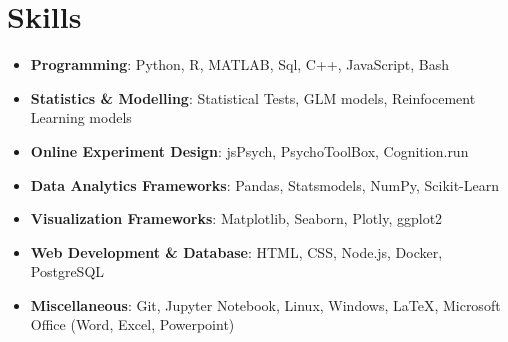 \documentclass[a4paper,10pt]{article}
\newcommand{\resumeItem}[2]{
  \item{
    \textbf{#1}{: #2}
  }
}
\newcommand{\resumeSubHeadingListStart}{\begin{itemize}[leftmargin=*]}
\newcommand{\resumeSubHeadingListEnd}{\end{itemize}}
\begin{document}
\section{Skills}
  \resumeSubHeadingListStart
    \resumeItem{Programming}{Python, R, MATLAB, Sql, C++, JavaScript, Bash}
    \resumeItem{Statistics \& Modelling}{Statistical Tests, GLM models, Reinfocement Learning models}
    \resumeItem{Online Experiment Design}{jsPsych, PsychoToolBox, Cognition.run}
    \resumeItem{Data Analytics Frameworks}{Pandas, Statsmodels, NumPy, Scikit-Learn}
    \resumeItem{Visualization Frameworks}{Matplotlib, Seaborn, Plotly, ggplot2}
    \resumeItem{Web Development \& Database}{HTML, CSS, Node.js, Docker, PostgreSQL}

    \resumeItem{Miscellaneous}{Git, Jupyter Notebook, Linux, Windows, \LaTeX, Microsoft Office (Word, Excel, Powerpoint)}


  \resumeSubHeadingListEnd
  
\end{document}
